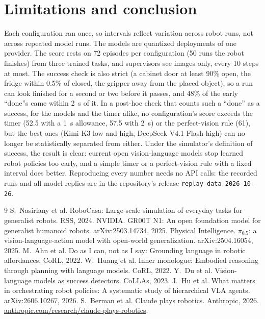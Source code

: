 \documentclass[10pt,twocolumn,letterpaper]{article}
\begin{document}
\section{Limitations and conclusion}
\label{sec:limits}
Each configuration ran once, so intervals reflect variation across robot runs, not across repeated model runs. The
models are quantized deployments of one provider. The score rests on 72 episodes per configuration (50 runs the robot
finishes) from three trained tasks, and supervisors see images only, every 10 steps at most. The success check is also strict (a
cabinet door at least 90\% open, the fridge within 0.5\% of closed, the gripper away from the placed object), so a run
can look finished for a second or two before it passes, and 48\% of the early ``done''s came within 2~s of it. In a
post-hoc check that counts such a ``done'' as a success, for the models and the timer alike, no configuration's score
exceeds the timer (52.5 with a 1~s allowance, 57.5 with 2~s) or the perfect-vision rule (61), but the best ones (Kimi
K3 low and high, DeepSeek V4.1 Flash high) can no longer be statistically separated from either. Under the
simulator's definition of success, the result is clear: current open vision-language models stop learned robot
policies too early, and a simple timer or a perfect-vision rule with a fixed interval does better. Reproducing every number needs no API calls: the recorded runs
and all model replies are in the repository's release \texttt{replay-data-2026-10-26}.

{\footnotesize
\begin{thebibliography}{9}\setlength{\itemsep}{0pt}
 S.~Nasiriany et al. RoboCasa: Large-scale simulation of everyday tasks for generalist robots. RSS, 2024.
 NVIDIA. GR00T N1: An open foundation model for generalist humanoid robots. arXiv:2503.14734, 2025.
 Physical Intelligence. $\pi_{0.5}$: a vision-language-action model with open-world generalization. arXiv:2504.16054, 2025.
 M.~Ahn et al. Do as I can, not as I say: Grounding language in robotic affordances. CoRL, 2022.
 W.~Huang et al. Inner monologue: Embodied reasoning through planning with language models. CoRL, 2022.
 Y.~Du et al. Vision-language models as success detectors. CoLLAs, 2023.
 J.~Hu et al. What matters in orchestrating robot policies: A systematic study of hierarchical VLA agents. arXiv:2606.10267, 2026.
 S.~Berman et al. Claude plays robotics. Anthropic, 2026. \url{anthropic.com/research/claude-plays-robotics}.
\end{thebibliography}}
\end{document}
